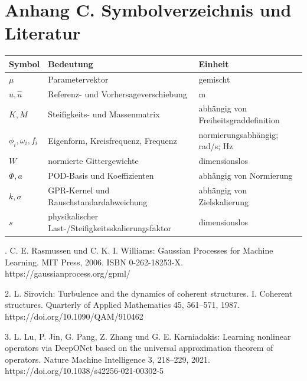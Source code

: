 \documentclass[11pt,a4paper]{article}
\begin{document}
\section{Anhang C. Symbolverzeichnis und Literatur}
\begingroup\small\begin{longtable}{>{\raggedright\arraybackslash}p{}>{\raggedright\arraybackslash}p{}>{\raggedright\arraybackslash}p{}}
\toprule
Symbol & Bedeutung & Einheit\\ \midrule\endhead
$\mu$ & Parametervektor & gemischt\\
$u,\hat u$ & Referenz- und Vorhersageverschiebung & m\\
$K,M$ & Steifigkeits- und Massenmatrix & abhängig von Freiheitsgraddefinition\\
$\phi_i,\omega_i,f_i$ & Eigenform, Kreisfrequenz, Frequenz & normierungsabhängig; rad/s; Hz\\
$W$ & normierte Gittergewichte & dimensionslos\\
$\Phi,a$ & POD-Basis und Koeffizienten & abhängig von Normierung\\
$k,\sigma$ & GPR-Kernel und Rauschstandardabweichung & abhängig von Zielskalierung\\
$s$ & physikalischer Last-/Steifigkeitsskalierungsfaktor & dimensionslos\\
\bottomrule\end{longtable}. C. E. Rasmussen und C. K. I. Williams: Gaussian Processes for Machine Learning. MIT Press, 2006. ISBN 0-262-18253-X. https://gaussianprocess.org/gpml/

2. L. Sirovich: Turbulence and the dynamics of coherent structures. I. Coherent structures. Quarterly of Applied Mathematics 45, 561–571, 1987. https://doi.org/10.1090/QAM/910462

3. L. Lu, P. Jin, G. Pang, Z. Zhang und G. E. Karniadakis: Learning nonlinear operators via DeepONet based on the universal approximation theorem of operators. Nature Machine Intelligence 3, 218–229, 2021. https://doi.org/10.1038/s42256-021-00302-5
\end{document}
